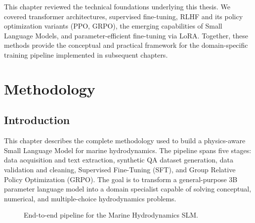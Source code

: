 \documentclass[12pt]{report}
\begin{document}
This chapter reviewed the technical foundations underlying this thesis. We covered transformer architectures, supervised fine-tuning, RLHF and its policy optimization variants (PPO, GRPO), the emerging capabilities of Small Language Models, and parameter-efficient fine-tuning via LoRA. Together, these methods provide the conceptual and practical framework for the domain-specific training pipeline implemented in subsequent chapters.


\chapter{Methodology}

\section{Introduction}

This chapter describes the complete methodology used to build a physics-aware Small Language Model for marine hydrodynamics. The pipeline spans five stages: data acquisition and text extraction, synthetic QA dataset generation, data validation and cleaning, Supervised Fine-Tuning (SFT), and Group Relative Policy Optimization (GRPO). The goal is to transform a general-purpose 3B parameter language model into a domain specialist capable of solving conceptual, numerical, and multiple-choice hydrodynamics problems.

\begin{figure}[H]
\centering
{}
\caption{End-to-end pipeline for the Marine Hydrodynamics SLM.}
\label{fig:pipeline}
\end{figure}
\end{document}
